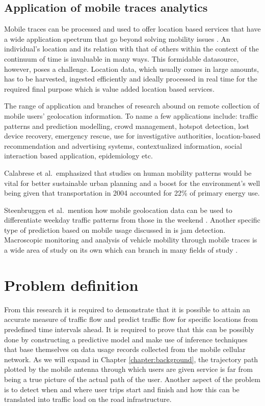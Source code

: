 \documentclass[12pt, a4paper]{report}
\theoremstyle{definition}
\theoremstyle{definition}%
\theoremstyle{definition}%
\theoremstyle{definition}%
\theoremstyle{definition}%
\theoremstyle{definition}%
\begin{document}
\subsection{Application of mobile traces analytics} \label{section:introduction:application_mobile_traces}

Mobile traces can be processed and used to offer location based services that have a wide application spectrum that go beyond solving mobility issues \cite{Hoteit2014,Calabrese2013,Gonzalez2008,Hoteit2016}. An individual's location and its relation with that of others within the context of the continuum of time is invaluable in many ways. This formidable datasource, however, poses a challenge. Location data, which usually comes in large amounts, has to be harvested, ingested efficiently and ideally processed in real time for the required final purpose which is value added location based services.

The range of application and branches of research abound on remote collection of mobile users' geolocation information.   To name a few applications include: traffic patterns and prediction modelling, crowd management, hotspot detection, lost device recovery, emergency rescue, use for investigative authorities,  location-based recommendation and advertising systems, contextualized information, social interaction based application, epidemiology etc.  

Calabrese et al.\ emphasized that studies on human mobility patterns would be vital for better sustainable urban planning and a boost for the environment's well being given that transportation in 2004 accounted for 22\% of primary energy use\cite{Calabrese2013}.

Steenbruggen et al.\ mention how mobile geolocation data can be used to differentiate weekday traffic patterns from those in the weekend \cite{Steenbruggen2015}. Another specific type of  prediction based on mobile usage discussed in \cite{Hoteit2014} is jam detection.  Macroscopic monitoring and analysis of vehicle mobility through mobile traces is a wide area of study on its own which can branch in many fields of study \cite{Steenbruggen2015}.


\section{Problem definition}
From this research it is required to demonstrate that it is possible to attain an accurate measure of traffic flow and predict traffic flow for specific locations from predefined time intervals ahead. It is required to prove that this can be possibly done by constructing a predictive model and make use of inference techniques that base themselves on data usage records collected from the mobile cellular network. As we will expand in Chapter \ref{chapter:background}, the trajectory path plotted by the mobile antenna through which users are given service is far from being a true picture of the actual path of the user.  Another aspect of the problem is to detect when and where user trips start and finish and how this can be translated into traffic load on the road infrastructure.
\end{document}
